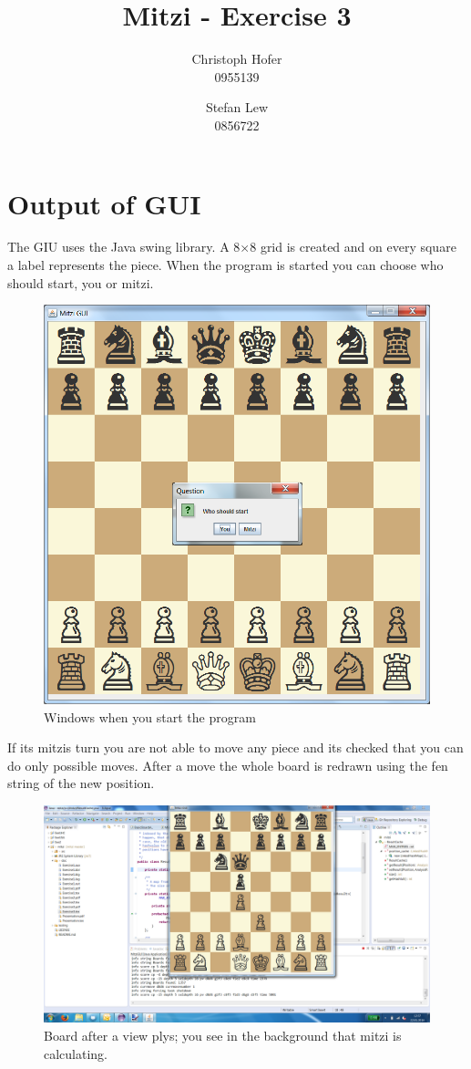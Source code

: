 \documentclass [12pt ,a4paper, english]{scrartcl}
\author{Christoph Hofer\\ 0955139 \and Stefan Lew \\ 0856722}
\title{Mitzi - Exercise 3}
\theoremstyle{plain}
\theoremstyle{definition}
\theoremstyle{remark}
\begin{document}
\maketitle
\newpage
\tableofcontents
\newpage

\section{Output of GUI}
The GIU uses the Java swing library. A 8$\times$8 grid is created and on every square a label represents the piece. When the program is started you can choose who should start, you or mitzi.
\begin{figure}[h!]
\includegraphics[scale=0.6]{out1.png}
\caption{Windows when you start the program}
\end{figure}

If its mitzis turn you are not able to move any piece and its checked that you can do only possible moves. After a move the whole board is redrawn using the fen string of the new position.

\begin{figure}[h!]
\includegraphics[scale=0.3]{out2.png}
\caption{Board after a view plys; you see in the background that mitzi is calculating.}
\end{figure}
\end{document}
